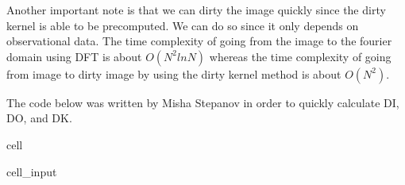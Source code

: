 \documentclass[letterpaper,10pt,english]{jupyterBook}
\begin{document}
\sphinxAtStartPar
Another important note is that we can dirty the image quickly since the dirty kernel is able to be precomputed. We can do so since it only depends on observational data. The time complexity of going from the image to the fourier domain using DFT is about \(O(N^2lnN)\) whereas the time complexity of going from image to dirty image by using the dirty kernel method is about \(O(N^2)\).

\sphinxAtStartPar
The code below was written by Misha Stepanov in order to quickly calculate DI, DO, and DK.

\begin{sphinxuseclass}{cell}\begin{sphinxVerbatimInput}

\begin{sphinxuseclass}{cell_input}
\begin{sphinxVerbatim}[commandchars=\\\{\}]
   
              


\end{sphinxVerbatim}
\end{sphinxuseclass}
\end{sphinxVerbatimInput}
\end{sphinxuseclass}
\end{document}
